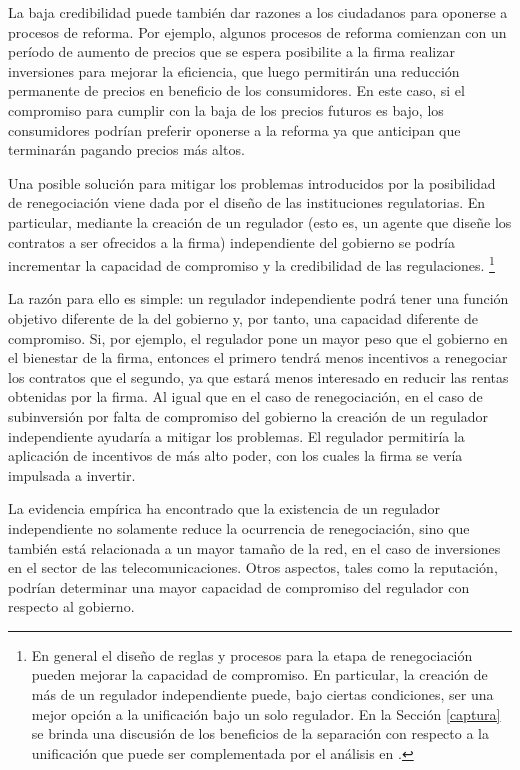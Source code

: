 \documentclass[
  12pt,
  spanish,
]{book}
\begin{document}
La baja credibilidad puede también dar razones a los ciudadanos para oponerse a procesos de reforma. Por ejemplo, algunos procesos de reforma comienzan con un período de aumento de precios que se espera posibilite a la firma realizar inversiones para mejorar la eficiencia, que luego permitirán una reducción permanente de precios en beneficio de los consumidores. En este caso, si el compromiso para cumplir con la baja de los precios futuros es bajo, los consumidores podrían preferir oponerse a la reforma ya que anticipan que terminarán pagando precios más altos.

Una posible solución para mitigar los problemas introducidos por la posibilidad de renegociación viene dada por el diseño de las instituciones regulatorias. En particular, mediante la creación de un regulador (esto es, un agente que diseñe los contratos a ser ofrecidos a la firma) independiente del gobierno se podría incrementar la capacidad de compromiso y la credibilidad de las regulaciones.
\footnote{En general el diseño de reglas y procesos para la etapa de renegociación pueden mejorar la capacidad de compromiso. En particular, la creación de más de un regulador independiente puede, bajo ciertas condiciones, ser una mejor opción a la unificación bajo un solo regulador. En la Sección \ref{captura} se brinda una discusión de los beneficios de la separación con respecto a la unificación que puede ser complementada por el análisis en \citet{Estache1999}.}

La razón para ello es simple: un regulador independiente podrá tener una función objetivo diferente de la del gobierno y, por tanto, una capacidad diferente de compromiso. Si, por ejemplo, el regulador pone un mayor peso que el gobierno en el bienestar de la firma, entonces el primero tendrá menos incentivos a renegociar los contratos que el segundo, ya que estará menos interesado en reducir las rentas obtenidas por la firma. Al igual que en el caso de renegociación, en el caso de subinversión por falta de compromiso del gobierno la creación de un regulador independiente ayudaría a mitigar los problemas. El regulador permitiría la aplicación de incentivos de más alto poder, con los cuales la firma se vería impulsada a invertir.

La evidencia empírica ha encontrado que la existencia de un regulador independiente no solamente reduce la ocurrencia de renegociación, sino que también está relacionada a un mayor tamaño de la red, en el caso de inversiones en el sector de las telecomunicaciones. Otros aspectos, tales como la reputación, podrían determinar una mayor capacidad de compromiso del regulador con respecto al gobierno.
\end{document}
